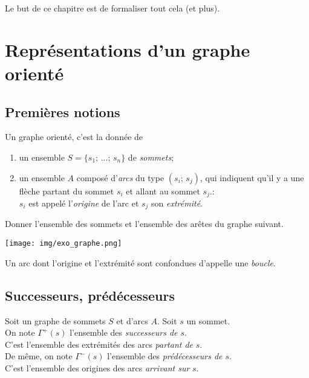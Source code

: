 \documentclass[a4paper,12pt]{book}
\begin{document}
Le but de ce chapitre est de formaliser tout cela (et plus).

\section{Représentations d'un graphe orienté}
\subsection{Premières notions}
\begin{definition}
Un graphe orienté, c'est la donnée de
\begin{enumerate}[--]
	\item 	un ensemble $S=\{s_1;\,...;\,s_n\}$ de \textit{sommets};
	\item 	un ensemble $A$ composé d'\textit{arcs} du type $(s_i;\,s_j)$, qui indiquent qu'il y a \og une flèche\fg{} partant du sommet $s_i$ et allant au sommet $s_j$.:\\ $s_i$ est appelé l'\textit{origine} de l'arc et $s_j$ son \textit{extrémité}.
\end{enumerate}
\end{definition}

\begin{exemple}[]
\end{exemple}

\begin{exercice}[]
Donner l'ensemble des sommets et l'ensemble des arêtes du graphe suivant.
\begin{center}
\texttt{[image: img/exo\_graphe.png]}
\end{center}
\end{exercice}
\begin{definition}[ : boucle]
Un arc dont l'origine et l'extrémité sont confondues d'appelle une \textit{boucle}.
\end{definition}
\subsection{Successeurs, prédécesseurs}

\begin{definition}
Soit un graphe de sommets $S$ et d'arcs $A$. Soit $s$ un sommet.\\
On note $\Gamma^+(s)$ l'ensemble des \textit{successeurs de $s$}.\\
C'est l'ensemble des extrémités des arcs \textit{partant de} $s$.\\
De même, on note $\Gamma^-(s)$ l'ensemble des \textit{prédécesseurs de $s$}.\\
C'est l'ensemble des origines des arcs \textit{arrivant sur} $s$.\\
\end{definition}
\end{document}
